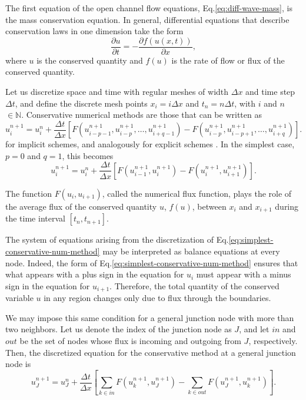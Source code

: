 \documentclass[bg, manuscript]{copernicus}
\begin{document}
The first equation of the open channel flow equations, Eq.\eqref{eq:diff-wave-mass}, is the mass conservation equation.
In general, differential equations that describe conservation laws in one dimension take the form
\begin{equation} \label{eq:conservation_pde}
\frac{\partial u}{\partial t} =-\frac{\partial f(u(x,t))}{\partial x},
\end{equation}
where $u$ is the conserved quantity and $f(u)$ is the rate of flow or flux  of the conserved quantity.

Let us discretize space and time with regular meshes of width $\Delta x$ and time step $\Delta t$, and define the discrete mesh points $x_i=i\Delta x$ and $t_n=n\Delta t$, with $i$ and $n$ $\in \mathbb{N}$.
Conservative numerical methods are those that can be written as
\begin{equation} \label{eq:general-discretization-consesrvative-pde}
u_i^{n+1} = u_i^n + \frac{\Delta t}{\Delta x} \left[F(u^{n+1}_{i-p-1}, u^{n+1}_{i-p}, \dots, u^{n+1}_{i+q-1}) - F(u^{n+1}_{i-p}, u^{n+1}_{i-p+1}, \dots, u^{n+1}_{i+q})\right]. 
\end{equation}
for implicit schemes, and analogously for explicit schemes \citep{levequeNumericalMethodsConservation1992}.
In the simplest case, $p = 0$ and $q=1$, this becomes
\begin{equation} \label{eq:simplest-conservative-num-method}
u_i^{n+1} = u_i^n + \frac{\Delta t}{\Delta x} \left[F(u^{n+1}_{i-1}, u^{n+1}_{i}) - F(u^{n+1}_{i}, u^{n+1}_{i+1})\right].
\end{equation}

The function $F(u_i, u_{i+1})$, called the numerical flux function, plays the role of the average   flux of the conserved quantity $u$, $f(u)$, between $x_i$ and $x_{i+1}$ during the time interval $[t_n, t_{n+1}]$.

The system of equations arising from the discretization of Eq.\eqref{eq:simplest-conservative-num-method} may be interpreted as balance equations at every node.
Indeed, the form of Eq.\eqref{eq:simplest-conservative-num-method} ensures that what appears with a plus sign in the equation for $u_i$  must appear with a minus sign in the equation for $u_{i+1}$.
Therefore, the total quantity of the conserved variable $u$ in any region changes only due to flux through the boundaries.

We may impose this same condition for a general junction node with more than two neighbors.
Let us denote the index of the junction node as $J$, and let $in$ and $out$ be the set of nodes whose flux is incoming and outgoing from $J$, respectively.
Then, the discretized equation for the conservative method at a general junction node is
\begin{equation}
    \label{eq:junction-node-conservative-num-method}
    u^{n+1}_J = u^{n}_J + \frac{\Delta t}{\Delta x}\left[ \sum_{k\in in}F\left(u^{n+1}_k, u^{n+1}_J\right) - \sum_{k\in out}F\left(u^{n+1}_J, u^{n+1}_k\right) \right].
\end{equation}
\end{document}

